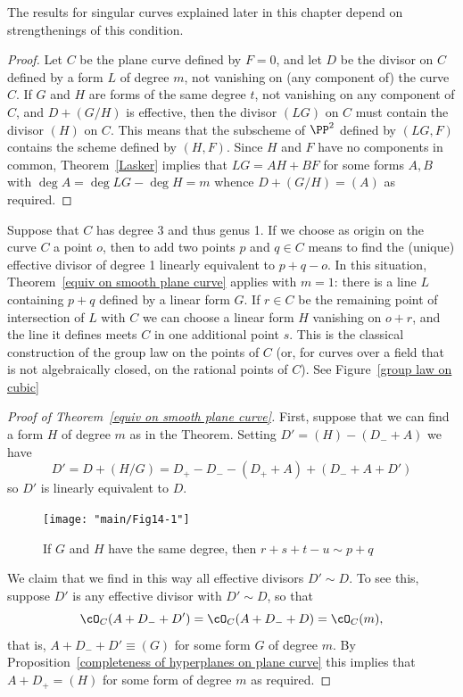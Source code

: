 The results for singular curves explained later in this chapter
 depend on strengthenings  of this condition.
 
\begin{proof}
Let $C$ be the plane curve defined by $F=0$, and let $D$ be the divisor on $C$ defined by a form $L$
of degree $m$, not vanishing on (any component of) the curve $C$. If $G$ and $H$ are forms of the same degree $t$, 
not vanishing on any component of $C$,
and $D+(G/H)$ is effective, then the divisor $(LG)$  on $C$ must contain the divisor $(H)$ on $C$.
This means that the subscheme of $\PP^{2}$ defined by $(LG,F)$ contains the scheme defined 
by $(H,F)$. Since $H$ and $F$ have no components in common, Theorem~\ref{Lasker} implies
that $LG = AH+BF$  for some forms $A,B$ with $\deg A = \deg LG -\deg H = m$ whence $D+(G/H) = (A)$
as required.
\end{proof}

\begin{example}
Suppose that $C$ has degree 3 and thus genus 1. If we choose as origin on the curve $C$ a point $o$, then to add two points $p$ and $q \in C$ means to find the (unique) effective divisor of degree 1 linearly equivalent to $p + q - o$. In this situation, Theorem~\ref{equiv on smooth plane curve} applies with $m=1$: there is a line $L$ 
containing $p+q$ defined by a linear form $G$. If $r \in C$ be the remaining point of intersection of $L$ with $C$ we can choose a linear form $H$ vanishing on $o+r$, and the line it defines meets $C$
in one additional point $s$. This is the classical construction of the group law on the points of $C$ (or,
for curves over a field that is not algebraically closed, on the rational points of $C$).
See Figure~\ref{group law on cubic}
\end{example}

\begin{proof}[Proof of Theorem~\ref{equiv on smooth plane curve}]
First, suppose that we can find a form $H$ of degree $m$ as in the Theorem.
Setting $D' = (H) -(D_{-}+A)$ we have
$$
D' = D + (H/G) = D_{+}- D_{-} - (D_{+}+A)+(D_{-}+A+D')
$$
so $D'$ is linearly equivalent to $D$. 

\begin{figure}
\begin{center}
\centerline {\texttt{[image: "main/Fig14-1"]}}
\caption{If $G$ and $H$ have the same degree, then $r+s+t-u\sim p+q$}
\label{Fig14.3}
\end{center}
\end{figure}

We claim that we find in this way all effective divisors $D' \sim D$. 
To see this, suppose $D'$ is any effective divisor with $D' \sim D$, so that
$$
\cO_C(A+D_{-}+D') = \cO_C(A+D_{-}+D)  = \cO_C(m),
$$
that is, $A+D_{-}+D' \equiv (G)$ for some form $G$ of degree $m$. By Proposition~\ref{completeness of hyperplanes on plane curve}
this implies that $A+D_{+} = (H)$ for some form of degree $m$ as required.
\end{proof}



